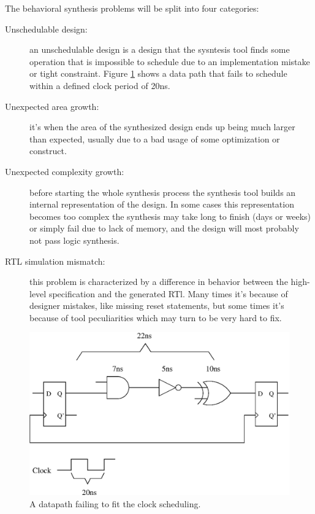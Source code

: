 \documentclass[a4paper, 12pt]{article}
\begin{document}
The behavioral synthesis problems will be split into four categories:
\begin{description}
\item[Unschedulable design:] an unschedulable design is a design that the sysntesis tool finds some operation that is impossible to schedule due to an implementation mistake or tight constraint. Figure \ref{fig:schedfail} shows a data path that fails to schedule within a defined clock period of 20ns.
\item[Unexpected area growth:] it's when the area of the synthesized design ends up being much larger than expected, usually due to a bad usage of some optimization or construct.
\item[Unexpected complexity growth:] before starting the whole synthesis process the synthesis tool builds an internal representation of the design. In some cases this representation becomes too complex the synthesis may take long to finish (days or weeks) or simply fail due to lack of memory, and the design will most probably not pass logic synthesis.
\item[RTL simulation mismatch:] this problem is characterized by a difference in behavior between the high-level specification and the generated RTl. Many times it's because of designer mistakes, like missing reset statements, but some times it's because of tool peculiarities which may turn to be very hard to fix.
\end{description}

\begin{figure}
\centering
\includegraphics{figs/schedfail.eps}
\caption{A datapath failing to fit the clock scheduling.}
\label{fig:schedfail}
\end{figure}
\end{document}
